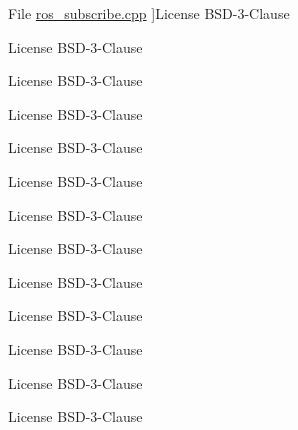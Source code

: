 \begin{DoxyRefList}
%
File \hyperlink{ros__subscribe_8cpp}{ros\+\_\+subscribe.cpp} ]License B\+S\+D-\/3-\/\+Clause  
\item[\label{license__license000027}%
\Hypertarget{license__license000027}%
File \hyperlink{ros__subscribe_8hh}{ros\+\_\+subscribe.hh} ]License B\+S\+D-\/3-\/\+Clause  
\item[\label{license__license000028}%
\Hypertarget{license__license000028}%
File \hyperlink{ros__subscribe_8hxx}{ros\+\_\+subscribe.hxx} ]License B\+S\+D-\/3-\/\+Clause  
\item[\label{license__license000060}%
\Hypertarget{license__license000060}%
File \hyperlink{ros__tf__listener_8cpp}{ros\+\_\+tf\+\_\+listener.cpp} ]License B\+S\+D-\/3-\/\+Clause  
\item[\label{license__license000029}%
\Hypertarget{license__license000029}%
File \hyperlink{ros__tf__listener_8hh}{ros\+\_\+tf\+\_\+listener.hh} ]License B\+S\+D-\/3-\/\+Clause  
\item[\label{license__license000061}%
\Hypertarget{license__license000061}%
File \hyperlink{ros__time_8cpp}{ros\+\_\+time.cpp} ]License B\+S\+D-\/3-\/\+Clause  
\item[\label{license__license000030}%
\Hypertarget{license__license000030}%
File \hyperlink{ros__time_8hh}{ros\+\_\+time.hh} ]License B\+S\+D-\/3-\/\+Clause  
\item[\label{license__license000039}%
\Hypertarget{license__license000039}%
File \hyperlink{run__command_8py}{run\+\_\+command.py} ]License B\+S\+D-\/3-\/\+Clause  
\item[\label{license__license000040}%
\Hypertarget{license__license000040}%
File \hyperlink{setup_8py}{setup.py} ]License B\+S\+D-\/3-\/\+Clause  
\item[\label{license__license000036}%
\Hypertarget{license__license000036}%
File \hyperlink{shell__client_8py}{shell\+\_\+client.py} ]License B\+S\+D-\/3-\/\+Clause  
\item[\label{license__license000002}%
\Hypertarget{license__license000002}%
File \hyperlink{simple__dgm_8hpp}{simple\+\_\+dgm.hpp} ]License B\+S\+D-\/3-\/\+Clause  
\item[\label{license__license000064}%
\Hypertarget{license__license000064}%
File \hyperlink{tools_8cpp}{tools.cpp} ]License B\+S\+D-\/3-\/\+Clause  
\item[\label{license__license000017}%
\Hypertarget{license__license000017}%
File \hyperlink{tools_8hh}{tools.hh} ]License B\+S\+D-\/3-\/\+Clause 
\end{DoxyRefList}